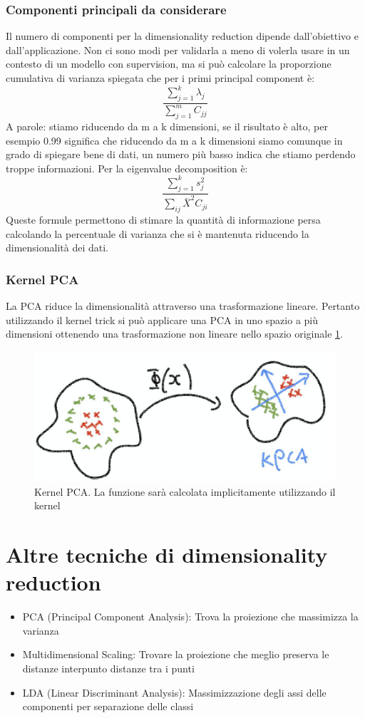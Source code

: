 		\subsubsection{Componenti principali da considerare}
		Il numero di componenti per la dimensionality reduction dipende dall'obiettivo e dall'applicazione.
		Non ci sono modi per validarla a meno di volerla usare in un contesto di un modello con supervision, ma si pu\`o calcolare la proporzione cumulativa di varianza spiegata che per i primi principal component \`e:
		$$\frac{\sum\limits_{j = 1}^k\lambda_j}{\sum\limits_{j = 1}^m C_{jj}}$$
		A parole: stiamo riducendo da m a k dimensioni, se il risultato \`e alto, per esempio 0.99 significa che riducendo da m a k dimensioni siamo comunque in grado di spiegare bene di dati, un numero pi\`u basso indica che stiamo perdendo troppe informazioni.
		Per la eigenvalue decomposition \`e:
		$$\frac{\sum\limits_{j = 1}^ks^2_j}{\sum\limits_{ij} \bar{X}^2C_{ji}}$$
		Queste formule permettono di stimare la quantit\`a di informazione persa calcolando la percentuale di varianza che si \`e mantenuta riducendo la dimensionalit\`a dei dati.
		
		\subsubsection{Kernel PCA}
		La PCA riduce la dimensionalit\`a attraverso una trasformazione lineare.
		Pertanto utilizzando il kernel trick si pu\`o applicare una PCA in uno spazio a pi\`u dimensioni ottenendo una trasformazione non lineare nello spazio originale \ref{fig:chapter12-10}.
		\begin{figure}
			\centering
			\includegraphics[width=0.6\linewidth]{imgs/chapter12/img10}
			\caption{Kernel PCA. La funzione sar\`a calcolata implicitamente utilizzando il kernel}
			\label{fig:chapter12-10}
		\end{figure}
		\section{Altre tecniche di dimensionality reduction}
		\begin{itemize}
			\item PCA (Principal Component Analysis): Trova la proiezione che massimizza la varianza
			\item Multidimensional Scaling: Trovare la proiezione che meglio preserva le distanze interpunto distanze tra i punti 
			\item LDA (Linear Discriminant Analysis): Massimizzazione degli assi delle componenti per separazione delle classi
		\end{itemize}
		
